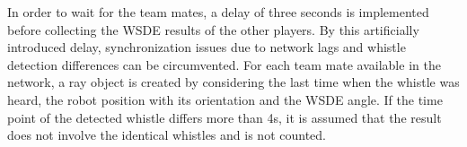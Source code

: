 In order to wait for the team mates,
a delay of three seconds is implemented before collecting the \ac{WSDE} results
of the other players.
By this artificially introduced delay, synchronization issues due to network lags and
whistle detection differences can be circumvented.
For each team mate available in the network, a ray object is created by considering the
last time when the whistle was heard, the robot position with its orientation and the \ac{WSDE} angle.
If the time point of the detected whistle differs more than 4\si{\second}, it is assumed that
the result does not involve the identical whistles and is not counted.

